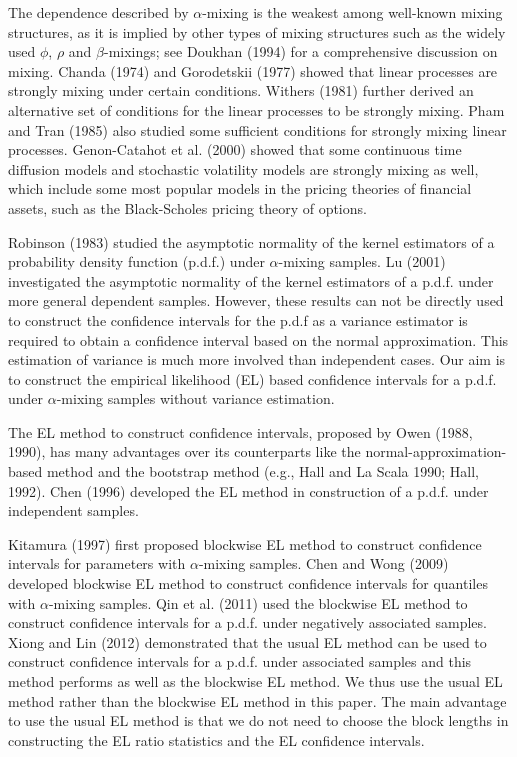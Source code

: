 \documentclass[12pt]{article}
\begin{document}
The dependence described by $\alpha$-mixing  is the weakest among well-known mixing structures, as it is implied by other types of mixing structures such as the widely used
$\phi$, $\rho$ and $\beta$-mixings; see Doukhan (1994) for a comprehensive discussion on mixing.  Chanda  (1974)  and Gorodetskii  (1977) showed that linear processes are strongly mixing under certain conditions. Withers (1981) further derived an alternative set of conditions for the linear processes to be strongly mixing. Pham and Tran (1985) also studied some sufficient conditions for strongly mixing linear processes. Genon-Catahot et al. (2000) showed that some continuous time diffusion models and stochastic volatility models are strongly mixing as well, which include some most popular models in the pricing theories of financial assets, such as the Black-Scholes pricing theory of options.


Robinson (1983) studied the asymptotic normality
of the kernel estimators of a probability density function (p.d.f.) under $\alpha$-mixing samples. Lu (2001) investigated the asymptotic normality
of the kernel estimators of a p.d.f. under more general dependent samples. However, these results can not be directly used to construct the
confidence intervals for the p.d.f as a variance estimator is required to obtain a confidence interval based on the normal approximation. This estimation of variance is much more involved than independent cases.  Our aim is to construct the empirical likelihood (EL) based confidence intervals for a p.d.f. under $\alpha$-mixing samples without variance estimation.

The EL method to construct confidence intervals, proposed by Owen
(1988, 1990), has many advantages over its counterparts like the
normal-approximation-based method and the bootstrap method (e.g.,
Hall and La Scala 1990; Hall, 1992). Chen (1996) developed the EL
method in construction of a p.d.f. under independent samples.

Kitamura (1997) first proposed  blockwise EL method to construct
confidence intervals for parameters with $\alpha$-mixing samples.  Chen and Wong (2009) developed  blockwise EL method to construct
confidence intervals for quantiles with $\alpha$-mixing samples.  Qin et al. (2011) used the blockwise EL method to construct confidence
intervals for a p.d.f. under negatively associated samples.
Xiong and Lin (2012) demonstrated that the usual EL method can be used to construct confidence intervals for a p.d.f. under associated samples and this method
performs as well as the blockwise EL method. We thus use the usual EL method rather than the blockwise EL method in this paper. The main
 advantage to use the usual EL method is that we do not need to choose the block lengths in constructing the EL ratio statistics and the EL
confidence intervals.
\end{document}
